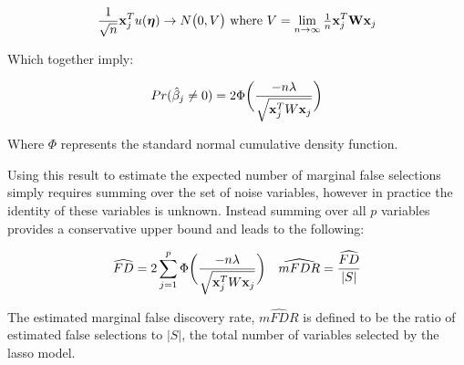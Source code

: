 \begin{equation}
\frac{1}{\sqrt{n}}\mathbf{x}_{j}^T u(\boldsymbol{\eta}) \rightarrow N\big(0, V\big) 
\text{   where } V = \lim_{n \to \infty} \tfrac{1}{n}\mathbf{x}_{j}^T \mathbf{W} \mathbf{x}_{j}
\end{equation}

Which together imply:

\begin{equation}
Pr(\hat{\beta}_j \neq 0)  = 2\Phi \bigg( \frac{-n\lambda}{\sqrt{ \mathbf{x}_j^TW\mathbf{x}_j}} \bigg)
\end{equation}

Where $\Phi$ represents the standard normal cumulative density function.


Using this result to estimate the expected number of marginal false selections simply requires summing over the set of noise variables, however in practice the identity of these variables is unknown. Instead summing over all $p$ variables provides a conservative upper bound and leads to the following:

\begin{align}
&\widehat{FD} = 2 \sum_{j=1}^{p} \Phi \bigg( \frac{-n\lambda}{\sqrt{\mathbf{x}_j^T W \mathbf{x}_j}} \bigg) & \widehat{mFDR} = \frac{\widehat{FD}}{|S|}
\end{align}

The estimated marginal false discovery rate, $\widehat{mFDR}$ is defined to be the ratio of estimated false selections to $|S|$, the total number of variables selected by the lasso model.


